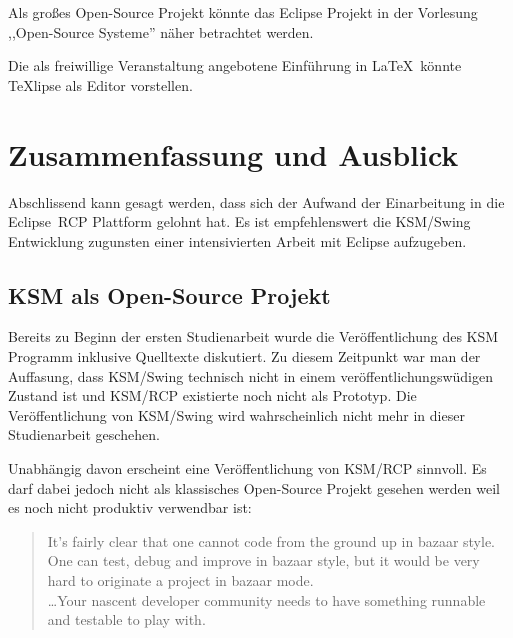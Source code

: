 \documentclass[%
12pt,titlepage,abstracton,DIV=10,BCOR=0.5cm]{scrreprt}
\begin{document}
Als großes Open-Source Projekt könnte das Eclipse Projekt in der Vorlesung
,,Open-Source Systeme'' näher betrachtet werden.

Die als freiwillige Veranstaltung angebotene Einführung in \LaTeX\ könnte
TeXlipse als Editor vorstellen.



\chapter{Zusammenfassung und Ausblick}\label{chapter:ausblick}
Abschlissend kann gesagt werden, dass sich der Aufwand der Einarbeitung in die
Eclipse~RCP Plattform gelohnt hat. Es ist empfehlenswert die KSM/Swing
Entwicklung zugunsten einer intensivierten Arbeit mit Eclipse aufzugeben.

\section{KSM als Open-Source Projekt}
Bereits zu Beginn der ersten Studienarbeit wurde die Veröffentlichung des KSM
Programm inklusive Quelltexte diskutiert. Zu diesem Zeitpunkt war man der
Auffasung, dass KSM/Swing technisch nicht in einem veröffentlichungswüdigen
Zustand ist und KSM/RCP existierte noch nicht als Prototyp.
Die Veröffentlichung von KSM/Swing wird wahrscheinlich nicht mehr in dieser
Studienarbeit geschehen.

Unabhängig davon erscheint eine Veröffentlichung von KSM/RCP sinnvoll. Es darf
dabei jedoch nicht als klassisches Open-Source Projekt gesehen werden weil es
noch nicht produktiv verwendbar ist:
\begin{quote}
It's fairly clear that one cannot code from the ground up in bazaar style.
One can test, debug and improve in bazaar style, but it would be very hard to
originate a project in bazaar mode.\\
\ldots Your nascent developer community needs to have something runnable and
testable to play with.
\end{quote}
\end{document}
